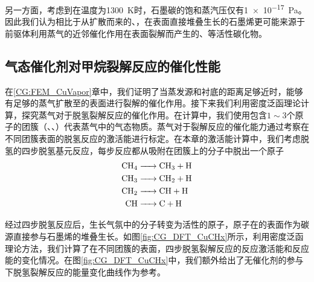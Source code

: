     另一方面，考虑到在温度为\SI{1300}{\kelvin}时，石墨碳的饱和蒸汽压仅有\SI{1e-17}{\pascal}。因此我们认为相比于从扩散而来的、，在表面直接堆叠生长的石墨烯更可能来源于前驱体利用蒸气的近邻催化作用在表面裂解而产生的、等活性碳化物。

    \subsection{气态催化剂对甲烷裂解反应的催化性能}
    在\ref{CG:FEM_CuVapor}章中，我们证明了当蒸发源和衬底的距离足够近时，能够有足够的蒸气扩散至的表面进行裂解的催化作用。接下来我们利用密度泛函理论计算，探究蒸气对于脱氢裂解反应的催化作用。在计算中，我们使用包含$1\sim 3$个原子的团簇（、、）代表蒸气中的气态物质。蒸气对于裂解反应的催化能力通过考察在不同团簇表面的脱氢反应的激活能进行标定。在本章的激活能计算中，我们考虑脱氢的四步脱氢基元反应，每步反应都从吸附在团簇上的分子中脱出一个原子\chinesecolon
    \begin{equation}
        \label{chemeq:CH4deH}
        \begin{split}
            \cemb{CH4 &-> CH3 + H}\\
            \cemb{CH3 &-> CH2 + H}\\
            \cemb{CH2 &-> CH + H}\\
            \cemb{CH &-> C + H}
        \end{split}
    \end{equation}

    经过四步脱氢反应后，生长气氛中的分子转变为活性的原子，原子在的表面作为碳源直接参与石墨烯的堆叠生长。如图\ref{fig:CG_DFT_CuCHx}所示，利用密度泛函理论方法，我们计算了在不同团簇的表面，四步脱氢裂解反应的反应激活能和反应能的变化情况。在图\ref{fig:CG_DFT_CuCHx}中，我们额外给出了无催化剂的参与下脱氢裂解反应的能量变化曲线作为参考。

